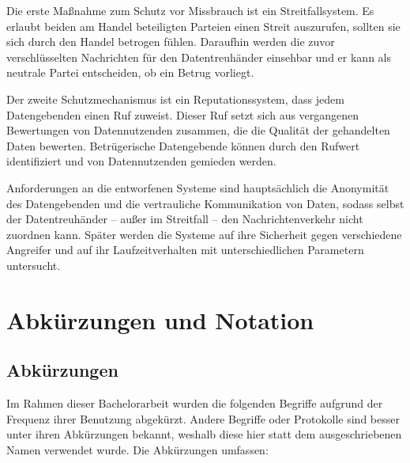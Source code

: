 \documentclass[
	fontsize=11pt,
	headings=small,
	parskip=half,           %
	bibliography=totoc,
	numbers=noenddot,       %
	open=any,               %
]{scrreprt}
\begin{document}
Die erste Maßnahme zum Schutz vor Missbrauch ist ein Streitfallsystem. Es erlaubt beiden am Handel beteiligten Parteien einen Streit auszurufen, sollten sie sich durch den Handel betrogen fühlen. Daraufhin werden die zuvor verschlüsselten Nachrichten für den Datentreuhänder einsehbar und er kann als neutrale Partei entscheiden, ob ein Betrug vorliegt.

Der zweite Schutzmechanismus ist ein Reputationssystem, dass jedem Datengebenden einen Ruf zuweist. Dieser Ruf setzt sich aus vergangenen Bewertungen von Datennutzenden zusammen, die die Qualität der gehandelten Daten bewerten. Betrügerische Datengebende können durch den Rufwert identifiziert und von Datennutzenden gemieden werden. 

Anforderungen an die entworfenen Systeme sind hauptsächlich die Anonymität des Datengebenden und die vertrauliche Kommunikation von Daten, sodass selbst der Datentreuhänder -- außer im Streitfall -- den Nachrichtenverkehr nicht zuordnen kann. Später werden die Systeme auf ihre Sicherheit gegen verschiedene Angreifer und auf ihr Laufzeitverhalten mit unterschiedlichen Parametern untersucht.

\restoregeometry
\chapter*{Abkürzungen und Notation}
\section*{Abkürzungen}
Im Rahmen dieser Bachelorarbeit wurden die folgenden Begriffe aufgrund der Frequenz ihrer Benutzung abgekürzt. Andere Begriffe oder Protokolle sind besser unter ihren Abkürzungen bekannt, weshalb diese hier statt dem ausgeschriebenen Namen verwendet wurde. Die Abkürzungen umfassen:
\end{document}
